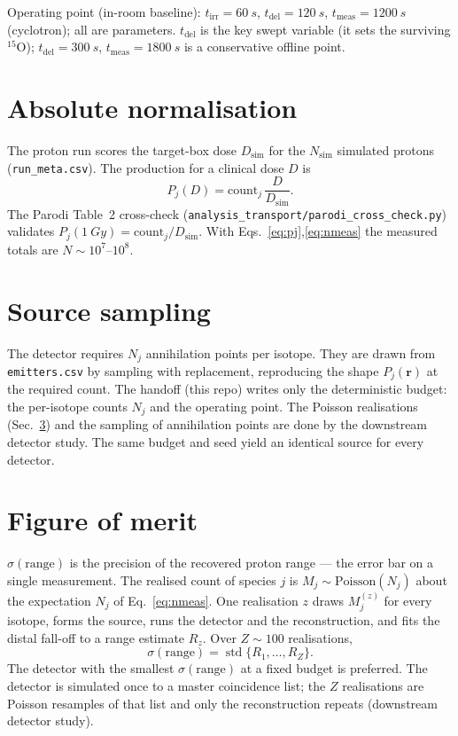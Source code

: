 \documentclass[11pt]{article}
\newcommand{\tirr}{t_{\mathrm{irr}}}
\newcommand{\tdel}{t_{\mathrm{del}}}
\newcommand{\tmeas}{t_{\mathrm{meas}}}
\begin{document}
Operating point (in-room baseline): $\tirr=\SI{60}{s}$, $\tdel=\SI{120}{s}$,
$\tmeas=\SI{1200}{s}$ (cyclotron); all are parameters. $\tdel$ is the key swept
variable (it sets the surviving $^{15}$O); $\tdel=\SI{300}{s}$,
$\tmeas=\SI{1800}{s}$ is a conservative offline point.

\section{Absolute normalisation}
\label{sec:norm}

The proton run scores the target-box dose $D_{\mathrm{sim}}$ for the $N_{\mathrm{sim}}$
simulated protons (\texttt{run\_meta.csv}). The production for a clinical dose
$D$ is
\begin{equation}
P_j(D) = \mathrm{count}_j\,\frac{D}{D_{\mathrm{sim}}}.
\label{eq:pj}
\end{equation}
The Parodi Table~2 cross-check
(\texttt{analysis\_transport/parodi\_cross\_check.py}) validates
$P_j(\SI{1}{Gy})=\mathrm{count}_j/D_{\mathrm{sim}}$. With
Eqs.~\eqref{eq:pj},\eqref{eq:nmeas} the measured totals are
$N\sim10^{7}$--$10^{8}$.

\section{Source sampling}
\label{sec:source}

The detector requires $N_j$ annihilation points per isotope. They are drawn from
\texttt{emitters.csv} by sampling with replacement, reproducing the shape
$P_j(\mathbf r)$ at the required count. The handoff (this repo) writes only the
deterministic budget: the per-isotope counts $N_j$ and the operating point. The
Poisson realisations (Sec.~\ref{sec:sigma}) and the sampling of annihilation
points are done by the downstream detector study. The same budget and
seed yield an identical source for every detector.

\section{Figure of merit}
\label{sec:sigma}

$\sigma(\text{range})$ is the precision of the recovered proton range --- the
error bar on a single measurement. The realised count of species $j$ is
$M_j\sim\mathrm{Poisson}(N_j)$ about the expectation $N_j$ of
Eq.~\eqref{eq:nmeas}. One realisation $z$ draws $M_j^{(z)}$ for every isotope,
forms the source, runs the detector and the reconstruction, and fits the distal
fall-off to a range estimate $R_z$. Over $Z\sim100$ realisations,
\begin{equation}
\sigma(\text{range}) = \operatorname{std}\{R_1,\dots,R_Z\}.
\end{equation}
The detector with the smallest $\sigma(\text{range})$ at a fixed budget is
preferred. The detector is simulated once to a master coincidence list; the $Z$
realisations are Poisson resamples of that list and only the reconstruction
repeats (downstream detector study).
\end{document}
